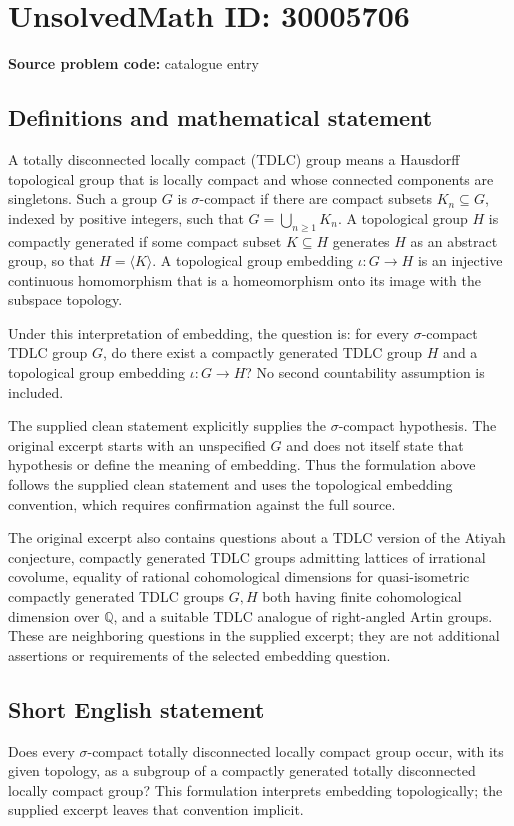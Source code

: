 \documentclass[11pt]{article}
\newcommand{\Q}{\mathbb{Q}}
\begin{document}
\section*{UnsolvedMath ID: 30005706}
\textbf{Source problem code:} catalogue entry
\subsection{Definitions and mathematical statement}
A totally disconnected locally compact (TDLC) group means a Hausdorff topological group that is locally compact and whose connected components are singletons. Such a group \(G\) is \(\sigma\)-compact if there are compact subsets \(K_n\subseteq G\), indexed by positive integers, such that \(G=\bigcup_{n\geq 1}K_n\). A topological group \(H\) is compactly generated if some compact subset \(K\subseteq H\) generates \(H\) as an abstract group, so that \(H=\langle K\rangle\). A topological group embedding \(\iota:G\to H\) is an injective continuous homomorphism that is a homeomorphism onto its image with the subspace topology.

Under this interpretation of embedding, the question is: for every \(\sigma\)-compact TDLC group \(G\), do there exist a compactly generated TDLC group \(H\) and a topological group embedding \(\iota:G\to H\)? No second countability assumption is included.

The supplied clean statement explicitly supplies the \(\sigma\)-compact hypothesis. The original excerpt starts with an unspecified \(G\) and does not itself state that hypothesis or define the meaning of embedding. Thus the formulation above follows the supplied clean statement and uses the topological embedding convention, which requires confirmation against the full source.

The original excerpt also contains questions about a TDLC version of the Atiyah conjecture, compactly generated TDLC groups admitting lattices of irrational covolume, equality of rational cohomological dimensions for quasi-isometric compactly generated TDLC groups \(G,H\) both having finite cohomological dimension over \(\Q\), and a suitable TDLC analogue of right-angled Artin groups. These are neighboring questions in the supplied excerpt; they are not additional assertions or requirements of the selected embedding question.
\subsection{Short English statement}
Does every \(\sigma\)-compact totally disconnected locally compact group occur, with its given topology, as a subgroup of a compactly generated totally disconnected locally compact group? This formulation interprets embedding topologically; the supplied excerpt leaves that convention implicit.
\end{document}
